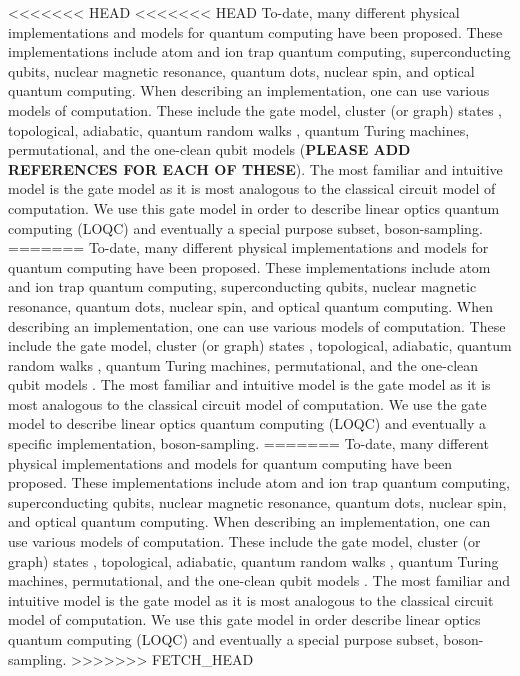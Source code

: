 \documentclass[aps,pra,twocolumn,amsmath,amssymb,nofootinbib,superscriptaddress]{revtex4}
\begin{document}
<<<<<<< HEAD
<<<<<<< HEAD
To-date, many different physical implementations and models for quantum computing have been proposed. These implementations include atom and ion trap quantum computing, superconducting qubits, nuclear magnetic resonance, quantum dots, nuclear spin, and optical quantum computing. When describing an implementation, one can use various models of computation. These include the gate model, cluster (or graph) states \cite{bib:Raussendorf01, bib:Raussendorf03}, topological, adiabatic, quantum random walks \cite{bib:ADZ}, quantum Turing machines, permutational, and the one-clean qubit models (\textbf{PLEASE ADD REFERENCES FOR EACH OF THESE}). The most familiar and intuitive model is the gate model as it is most analogous to the classical circuit model of computation. We use this gate model in order to describe linear optics quantum computing (LOQC) and eventually a special purpose subset, boson-sampling.
=======
To-date, many different physical implementations and models for quantum computing have been proposed. These implementations include atom and ion trap quantum computing, superconducting qubits, nuclear magnetic resonance, quantum dots, nuclear spin, and optical quantum computing. When describing an implementation, one can use various models of computation. These include the gate model, cluster (or graph) states \cite{bib:Raussendorf01, bib:Raussendorf03}, topological, adiabatic, quantum random walks \cite{bib:ADZ}, quantum Turing machines, permutational, and the one-clean qubit models \cite{jordan}. The most familiar and intuitive model is the gate model as it is most analogous to the classical circuit model of computation. We use the gate model to describe linear optics quantum computing (LOQC) and eventually a specific implementation, boson-sampling.
=======
To-date, many different physical implementations and models for quantum computing have been proposed. These implementations include atom and ion trap quantum computing, superconducting qubits, nuclear magnetic resonance, quantum dots, nuclear spin, and optical quantum computing. When describing an implementation, one can use various models of computation. These include the gate model, cluster (or graph) states \cite{bib:Raussendorf01, bib:Raussendorf03}, topological, adiabatic, quantum random walks \cite{bib:ADZ}, quantum Turing machines, permutational, and the one-clean qubit models \cite{jordan}. The most familiar and intuitive model is the gate model as it is most analogous to the classical circuit model of computation. We use this gate model in order describe linear optics quantum computing (LOQC) and eventually a special purpose subset, boson-sampling.
>>>>>>> FETCH_HEAD
\end{document}
